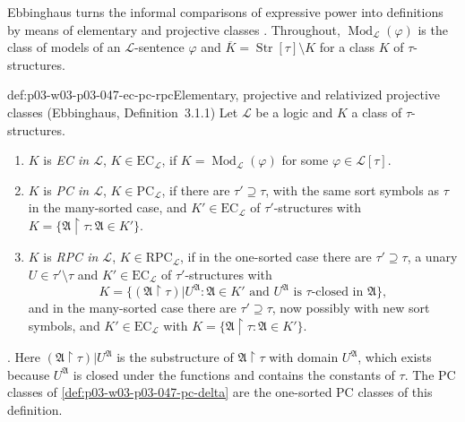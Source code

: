 Ebbinghaus turns the informal comparisons of expressive power into
definitions by means of elementary and projective classes
\cite[Ch.~II, \S3, p.~41]{Ebbinghaus1985ExtendedLogics}.  Throughout,
\(\operatorname{Mod}_{\mathscr L}(\varphi)\) is the class of models of an
\(\mathscr L\)-sentence \(\varphi\) and \(\overline K=\operatorname{Str}[\tau]\setminus K\)
for a class \(K\) of \(\tau\)-structures.

\begin{hbdefinition}{def:p03-w03-p03-047-ec-pc-rpc}{Elementary, projective and relativized projective classes (Ebbinghaus, Definition~3.1.1)}
Let \(\mathscr L\) be a logic and \(K\) a class of \(\tau\)-structures.
\begin{enumerate}
 \item \(K\) is \emph{EC in \(\mathscr L\)}, \(K\in\mathrm{EC}_{\mathscr L}\),
       if \(K=\operatorname{Mod}_{\mathscr L}(\varphi)\) for some
       \(\varphi\in\mathscr L[\tau]\).
 \item \(K\) is \emph{PC in \(\mathscr L\)}, \(K\in\mathrm{PC}_{\mathscr L}\),
       if there are \(\tau'\supseteq\tau\), with the same sort symbols as
       \(\tau\) in the many-sorted case, and \(K'\in\mathrm{EC}_{\mathscr L}\)
       of \(\tau'\)-structures with
       \(K=\{\mathfrak A\restriction\tau:\mathfrak A\in K'\}\).
 \item \(K\) is \emph{RPC in \(\mathscr L\)}, \(K\in\mathrm{RPC}_{\mathscr L}\),
       if in the one-sorted case there are \(\tau'\supseteq\tau\), a unary
       \(U\in\tau'\setminus\tau\) and \(K'\in\mathrm{EC}_{\mathscr L}\) of
       \(\tau'\)-structures with
       \[
        K=\{(\mathfrak A\restriction\tau)|U^{\mathfrak A}:
          \mathfrak A\in K'\text{ and }U^{\mathfrak A}\text{ is }\tau\text{-closed in }\mathfrak A\},
       \]
       and in the many-sorted case there are \(\tau'\supseteq\tau\), now
       possibly with new sort symbols, and \(K'\in\mathrm{EC}_{\mathscr L}\)
       with \(K=\{\mathfrak A\restriction\tau:\mathfrak A\in K'\}\).
\end{enumerate}
\cite[Ch.~II, Definition~3.1.1, pp.~41--42]{Ebbinghaus1985ExtendedLogics}.
Here \((\mathfrak A\restriction\tau)|U^{\mathfrak A}\) is the substructure
of \(\mathfrak A\restriction\tau\) with domain \(U^{\mathfrak A}\), which
exists because \(U^{\mathfrak A}\) is closed under the functions and
contains the constants of \(\tau\).  The PC classes of
\cref{def:p03-w03-p03-047-pc-delta} are the one-sorted PC classes of this
definition.
\end{hbdefinition}

